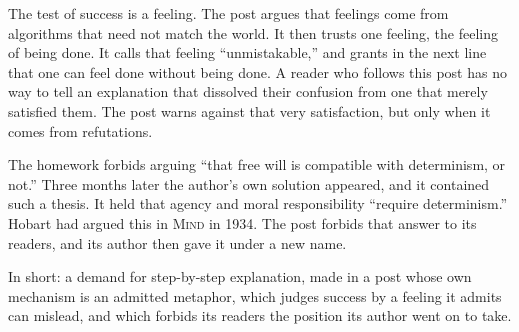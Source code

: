 \begin{afterword}
The test of success is a feeling. The post argues that feelings come from algorithms that need not match the world. It then trusts one feeling, the feeling of being done. It calls that feeling ``unmistakable,'' and grants in the next line that one can feel done without being done. A reader who follows this post has no way to tell an explanation that dissolved their confusion from one that merely satisfied them. The post warns against that very satisfaction, but only when it comes from refutations.

The homework forbids arguing ``that free will is compatible with determinism, or not.'' Three months later the author's own solution appeared, and it contained such a thesis. It held that agency and moral responsibility ``require determinism.'' Hobart had argued this in \textsc{Mind} in 1934. The post forbids that answer to its readers, and its author then gave it under a new name.

In short: a demand for step-by-step explanation, made in a post whose own mechanism is an admitted metaphor, which judges success by a feeling it admits can mislead, and which forbids its readers the position its author went on to take.
\end{afterword}

